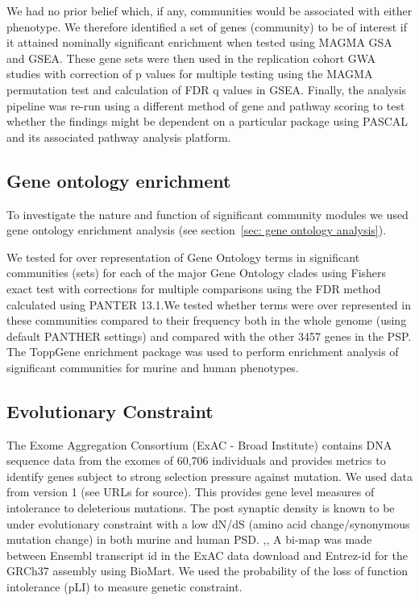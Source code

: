 We had no prior belief which, if any, communities would be associated with either phenotype. We therefore identified a set of genes (community) to be of interest if it attained nominally significant enrichment when tested using MAGMA GSA and GSEA. These gene sets were then used in the replication cohort GWA studies with correction of p values for multiple testing using the MAGMA permutation test and calculation of FDR q values in GSEA. Finally, the analysis pipeline was re-run using a different method of gene
and pathway scoring to test whether the findings might be dependent on a particular package using PASCAL and its associated pathway analysis platform. \cite{lamparter2016fast}  

\subsection{Gene ontology enrichment}
To investigate the nature and function of significant community modules we used gene ontology enrichment analysis (see section~\ref{sec: gene ontology analysis}). \cite{mi2013large}  

 We tested for over representation of Gene Ontology terms in significant communities (sets) for each of the major Gene Ontology clades using Fishers exact test with corrections for multiple comparisons using the FDR method calculated using PANTER 13.1.\cite{mi2013large}We tested whether terms were over represented in these communities compared to their frequency both in the whole genome (using default  PANTHER settings) and compared with the  other 3457 genes in the PSP. \cite{mi2013large}  The ToppGene enrichment package was used to perform enrichment analysis of significant communities for murine and human phenotypes. \cite{chen2009toppgene}  

\subsection{Evolutionary Constraint}

The Exome Aggregation Consortium (ExAC - Broad Institute) contains DNA sequence data from the exomes of 60,706 individuals and provides metrics to identify genes subject to strong selection pressure against mutation. \cite{lek2016analysis}  We used data from version 1 (see URLs for source). This provides gene level measures of intolerance to deleterious mutations. The post synaptic density is known to be under evolutionary constraint with a low dN/dS (amino acid change/synonymous mutation change) in both murine and human PSD. \cite{ryan2009origin},\cite{bayes2012comparative},\cite{bayes2011characterization}  A bi-map was made between Ensembl transcript id in the ExAC data download and Entrez-id for the GRCh37 assembly using BioMart. \cite{smedley2015biomart}  We used the probability of the loss of function intolerance (pLI) to measure genetic constraint.



